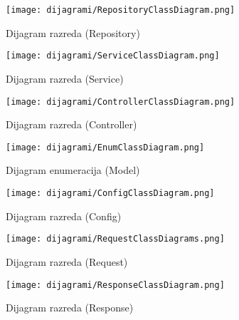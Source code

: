             \begin{figure}[H]
			         \texttt{[image: dijagrami/RepositoryClassDiagram.png]}
			         \centering
			         \caption{Dijagram razreda (Repository)}
			         \label{fig:RepositoryClassDiagram}
		          \end{figure}

            \begin{figure}[H]
			         \texttt{[image: dijagrami/ServiceClassDiagram.png]}
			         \centering
			         \caption{Dijagram razreda (Service)}
			         \label{fig:ServiceClassDiagram}
		          \end{figure}

            \begin{figure}[H]
			         \texttt{[image: dijagrami/ControllerClassDiagram.png]}
			         \centering
			         \caption{Dijagram razreda (Controller)}
			         \label{fig:ControllerClassDiagram}
		          \end{figure}

            \begin{figure}[H]
			         \texttt{[image: dijagrami/EnumClassDiagram.png]}
			         \centering
			         \caption{Dijagram enumeracija (Model)}
			         \label{fig:EnumClassDiagram}
		          \end{figure}

            \begin{figure}[H]
			         \texttt{[image: dijagrami/ConfigClassDiagram.png]}
			         \centering
			         \caption{Dijagram razreda (Config)}
			         \label{fig:ConfigClassDiagram}
		          \end{figure}

            \begin{figure}[H]
			         \texttt{[image: dijagrami/RequestClassDiagrams.png]}
			         \centering
			         \caption{Dijagram razreda (Request)}
			         \label{fig:RequestClassDiagrams}
		          \end{figure}

            \begin{figure}[H]
			         \texttt{[image: dijagrami/ResponseClassDiagram.png]}
			         \centering
			         \caption{Dijagram razreda (Response)}
			         \label{fig:ResponseClassDiagram}
		          \end{figure}
			
			
			
